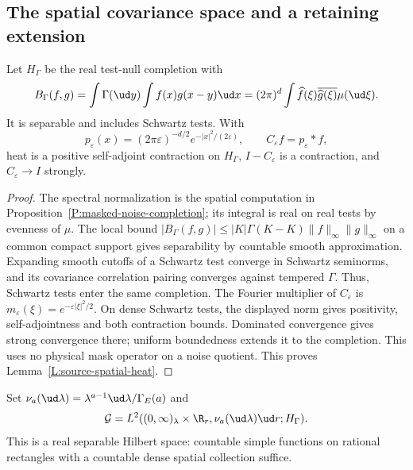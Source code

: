 \subsection{The spatial covariance space and a retaining extension}

\begin{lemma}\label{L:source-spatial-heat}
  Let $H_\Gamma$ be the real test-null completion with
  \[
    B_\Gamma(f,g)=\int\Gamma(\ud y)\int f(x)g(x-y)\ud x
    =(2\pi)^d\int\widehat f(\xi)\overline{\widehat g(\xi)}\mu(\ud\xi).
  \]
  It is separable and includes Schwartz tests. With
  \begin{equation}\label{E:source-heat-definition}
    p_\varepsilon(x)=(2\pi\varepsilon)^{-d/2}
    e^{-|x|^2/(2\varepsilon)},\qquad C_\varepsilon f=p_\varepsilon*f,
  \end{equation}
  heat is a positive self-adjoint contraction on $H_\Gamma$,
  $I-C_\varepsilon$ is a contraction, and $C_\varepsilon\to I$ strongly.
\end{lemma}

\begin{proof}
  The spectral normalization is the spatial computation in
  Proposition~\ref{P:masked-noise-completion}; its integral is real on
  real tests by evenness of $\mu$. The local bound
  $|B_\Gamma(f,g)|\le |K|\Gamma(K-K)\|f\|_\infty\|g\|_\infty$
  on a common compact support gives separability by countable smooth
  approximation. Expanding smooth cutoffs of a Schwartz test converge
  in Schwartz seminorms, and its covariance correlation pairing converges
  against tempered $\Gamma$. Thus, Schwartz tests enter the same completion.
  The Fourier multiplier of $C_\varepsilon$ is
  $m_\varepsilon(\xi)=e^{-\varepsilon|\xi|^2/2}$.
  On dense Schwartz tests, the displayed norm gives positivity,
  self-adjointness and both contraction bounds. Dominated convergence
  gives strong convergence there; uniform boundedness extends it to the
  completion. This uses no physical mask operator on a noise quotient.
  This proves Lemma~\ref{L:source-spatial-heat}.
\end{proof}

Set $\nu_a(\ud\lambda)=\lambda^{a-1}\ud\lambda/\Gamma_E(a)$ and
\[
  \mathcal G=L^2((0,\infty)_\lambda\times\R_r,
  \nu_a(\ud\lambda)\ud r;H_\Gamma).
\]
This is a real separable Hilbert space: countable simple functions on
rational rectangles with a countable dense spatial collection suffice.

